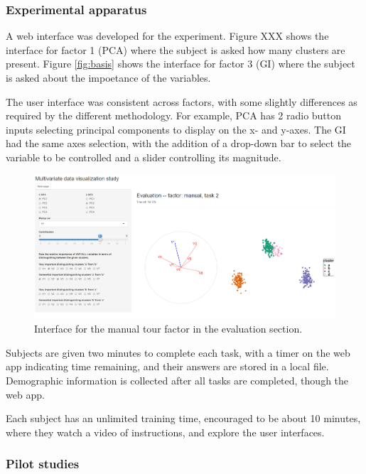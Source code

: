 \documentclass[11,]{article}
\begin{document}
\hypertarget{experimental-apparatus}{%
\subsubsection{Experimental apparatus}\label{experimental-apparatus}}

A web interface was developed for the experiment. Figure XXX shows the interface for factor 1 (PCA) where the subject is asked how many clusters are present. Figure \ref{fig:basis} shows the interface for factor 3 (GI) where the subject is asked about the impoetance of the variables.

The user interface was consistent across factors, with some slightly differences as required by the different methodology. For example, PCA has 2 radio button inputs selecting principal components to display on the x- and y-axes. The GI had the same axes selection, with the addition of a drop-down bar to select the variable to be controlled and a slider controlling its magnitude.

\begin{figure}[h]

{\centering \includegraphics[width=0.8\linewidth,]{./figures/appManualFactor} 

}

\caption{Interface for the manual tour factor in the evaluation section.}\label{fig:appManualFactor}
\end{figure}

Subjects are given two minutes to complete each task, with a timer on the web app indicating time remaining, and their answers are stored in a local file. Demographic information is collected after all tasks are completed, though the web app.

Each subject has an unlimited training time, encouraged to be about 10 minutes, where they watch a video of instructions, and explore the user interfaces.

\hypertarget{pilot-studies}{%
\subsubsection{Pilot studies}\label{pilot-studies}}
\end{document}
